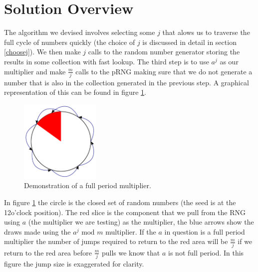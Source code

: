 \documentclass[11pt]{article} %
\begin{document}
\section{Solution Overview}
The algorithm we devised involves selecting some $j$ that alows us to traverse the full cycle of numbers quickly (the choice of $j$ is discussed in detail in section \ref{choosej}). We then make $j$ calls to the random number generator storing the results in some collection with fast lookup. The third step is to use $a^j$ as our multiplier and make $\frac{m}{j}$ calls to the pRNG making sure that we do not generate a number that is also in the collection generated in the previous step. A graphical representation of this can be found in figure \ref{fig:fpmWithJump}.
\\
\begin{figure}[H]
\centering
\includegraphics[width=0.34\textwidth]{fpmWithJump.pdf}
\caption{\label{fig:fpmWithJump} Demonstration of a full period multiplier.}
\end{figure}
In figure \ref{fig:fpmWithJump} the circle is the closed set of random numbers (the seed is at the 12o'clock position). The red slice is the component that we pull from the RNG using $a$ (the multiplier we are testing) as the multiplier, the blue arrows show the draws made using the $a^j \textrm{ mod } m$ multiplier. If the $a$ in question is a full period multiplier the number of jumps required to return to the red area will be $\frac{m}{j}$ if we return to the red area before $\frac{m}{j}$ pulls we know that $a$ is not full period. In this figure the jump size is exaggerated for clarity.
\end{document}

